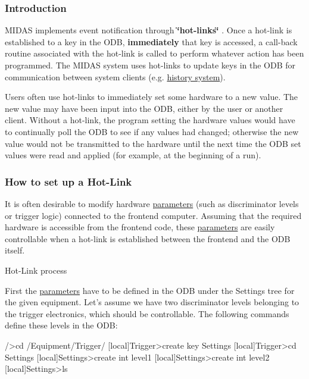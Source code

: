 \par
 \label{RC_Hot_Link_idx_hotlink}
\hypertarget{RC_Hot_Link_idx_hotlink}{}
 \label{RC_Hot_Link_idx_event_notification-see-hotlink}
\hypertarget{RC_Hot_Link_idx_event_notification-see-hotlink}{}
 \hypertarget{RC_Hot_Link_RC_Hot_Link_Intro}{}\subsubsection{Introduction}\label{RC_Hot_Link_RC_Hot_Link_Intro}
MIDAS implements event notification through {\bfseries  \char`\"{}hot-\/links\char`\"{} }. Once a hot-\/link is established to a key in the ODB, {\bfseries immediately} that key is accessed, a call-\/back routine associated with the hot-\/link is called to perform whatever action has been programmed. The MIDAS system uses hot-\/links to update keys in the ODB for communication between system clients (e.g. \hyperlink{F_History_logging_F_Frontend_History_Event}{history system}).

Users often use hot-\/links to immediately set some hardware to a new value. The new value may have been input into the ODB, either by the user or another client. Without a hot-\/link, the program setting the hardware values would have to continually poll the ODB to see if any values had changed; otherwise the new value would not be transmitted to the hardware until the next time the ODB set values were read and applied (for example, at the beginning of a run). \par




\hypertarget{RC_Hot_Link_RC_Example_Hot_Link}{}\subsubsection{How to set up a Hot-\/Link}\label{RC_Hot_Link_RC_Example_Hot_Link}
It is often desirable to modify hardware \hyperlink{structparameters}{parameters} (such as discriminator levels or trigger logic) connected to the frontend computer. Assuming that the required hardware is accessible from the frontend code, these \hyperlink{structparameters}{parameters} are easily controllable when a hot-\/link is established between the frontend and the ODB itself.

\begin{center} Hot-\/Link process  \end{center} 

First the \hyperlink{structparameters}{parameters} have to be defined in the ODB under the Settings tree for the given equipment. Let's assume we have two discriminator levels belonging to the trigger electronics, which should be controllable. The following commands define these levels in the ODB: 
\begin{DoxyCode}
[local]/>cd /Equipment/Trigger/
[local]Trigger>create key Settings
[local]Trigger>cd Settings
[local]Settings>create int level1
[local]Settings>create int level2
[local]Settings>ls
\end{DoxyCode}


